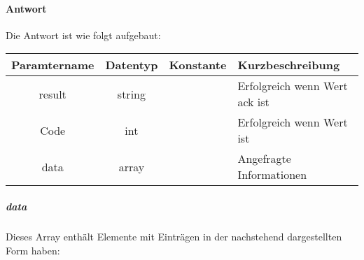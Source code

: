 \paragraph{Antwort}Die Antwort ist wie folgt aufgebaut:
\begin{table}[H]
	\begin{tabular}{|c|c|c|p{6.5cm}|}
		\hline
		\textbf{Paramtername} & \textbf{Datentyp} & \textbf{Konstante} & \textbf{Kurzbeschreibung}                                                                                               \\ \hline
		result              & string           &                 & Erfolgreich wenn Wert {\glqq ack\grqq} ist \\ \hline
		Code                & int              &                 & Erfolgreich wenn Wert {\glqq 0\grqq} ist \\ \hline
		data                & array            &                 & Angefragte Informationen \\ \hline
	\end{tabular}
\end{table}
\subparagraph{data}Dieses Array enthält Elemente mit Einträgen in der nachstehend dargestellten Form haben:
